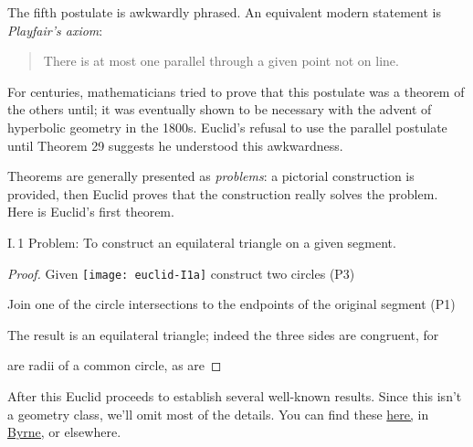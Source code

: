 The fifth postulate is awkwardly phrased. An equivalent modern statement is \emph{Playfair's axiom}:
\begin{quote}
There is at most one parallel through a given point not on line.
\end{quote}
For centuries, mathematicians tried to prove that this postulate was a theorem of the others until; it was eventually shown to be necessary with the advent of hyperbolic geometry in the 1800s. Euclid's refusal to use the parallel postulate until Theorem 29 suggests he understood this awkwardness.\smallbreak


Theorems are generally presented as \emph{problems}: a pictorial construction is provided, then Euclid proves that the construction really solves the problem. Here is Euclid's first theorem.

\begin{thm*}{I.\,1}{}\label{pg:euclidI1}
Problem: To construct an equilateral triangle on a given segment.
\end{thm*}

\begin{proof}
Given \texttt{[image: euclid-I1a]} construct two circles (P3)\quad{}\par\vspace{-23pt}
Join one of the circle intersections to the endpoints of the original segment (P1)\quad {}\par\vspace{-11pt}
The result is an equilateral triangle; indeed the three sides are congruent, for\par {} are radii of a common circle,
as are 
\end{proof}

\goodbreak

After this Euclid proceeds to establish several well-known results. Since this isn't a geometry class, we'll omit most of the details. You can find these \href{http://math.uci.edu/~ndonalds/math161/euclid.pdf}{here,} in \href{http://math.uci.edu/~ndonalds/Elements-I-VI.pdf}{Byrne,} or elsewhere.

